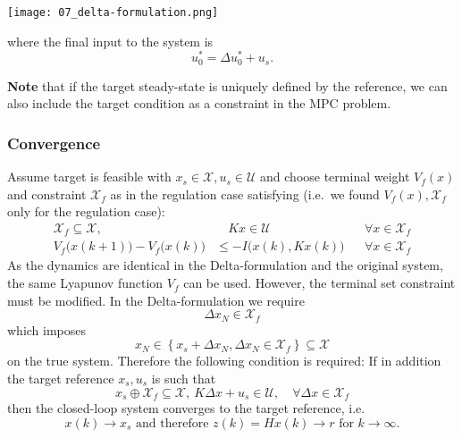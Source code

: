 \begin{center}
    \texttt{[image: 07\_delta-formulation.png]}
\end{center}

where the final input to the system is
\begin{equation*}
    u_0^* = \Delta u_0^* + u_s.
\end{equation*}

\textbf{Note} that if the target steady-state is uniquely defined by the reference, we can also include the target condition as a constraint in the MPC problem.

\subsubsection{Convergence}

Assume target is feasible with $x_s \in \mathcal{X}, u_s \in \mathcal{U}$ and choose terminal weight $V_f(x)$ and constraint $\mathcal{X}_f$ as in the regulation case satisfying (i.e.\ we found $V_f(x), \mathcal{X}_f$ only for the regulation case):
\begin{align*}
    \mathcal{X}_f \subseteq \mathcal{X},        & \quad Kx \in \mathcal{U}      &  & \forall x \in \mathcal{X}_f \\
    V_f\bigl(x(k+1)\bigr) - V_f\bigl(x(k)\bigr) & \leq -I\bigl(x(k),Kx(k)\bigr) &  & \forall x \in \mathcal{X}_f
\end{align*}
\newpar{}
As the dynamics are identical in the Delta-formulation and the original system, the same Lyapunov function $V_f$ can be used.
\newpar{}
However, the terminal set constraint must be modified. In the Delta-formulation we require
\begin{equation*}
    \Delta x_N \in \mathcal{X}_f
\end{equation*}
which imposes
\begin{equation*}
    x_N \in \left\{x_s + \Delta x_N, \Delta x_N \in \mathcal{X}_f\right\} \subseteq \mathcal{X}
\end{equation*}
on the true system. Therefore the following condition is required: If in addition the target reference $x_s, u_s$ is such that
\begin{equation*}
    x_s \oplus \mathcal{X}_f \subseteq \mathcal{X}, \: K\Delta x + u_s \in \mathcal{U}, \quad \forall \Delta x \in \mathcal{X}_f
\end{equation*}
then the closed-loop system converges to the target reference, i.e.
\begin{equation*}
    x(k) \to x_s \text{ and therefore } z(k) = Hx(k) \to r \text{ for } k \to \infty.
\end{equation*}

